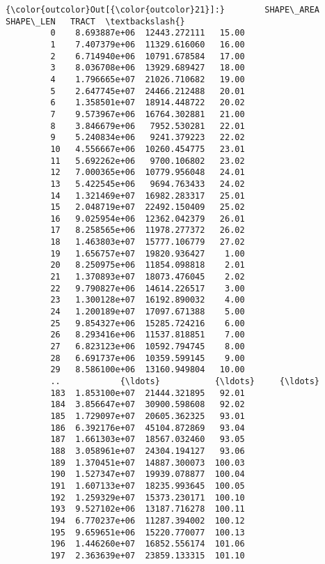 \documentclass[11pt]{article}
\begin{document}
\begin{Verbatim}[commandchars=\\\{\}]
{\color{outcolor}Out[{\color{outcolor}21}]:}        SHAPE\_AREA     SHAPE\_LEN   TRACT  \textbackslash{}
         0    8.693887e+06  12443.272111   15.00   
         1    7.407379e+06  11329.616060   16.00   
         2    6.714940e+06  10791.678584   17.00   
         3    8.036708e+06  13929.689427   18.00   
         4    1.796665e+07  21026.710682   19.00   
         5    2.647745e+07  24466.212488   20.01   
         6    1.358501e+07  18914.448722   20.02   
         7    9.573967e+06  16764.302881   21.00   
         8    3.846679e+06   7952.530281   22.01   
         9    5.240834e+06   9241.379223   22.02   
         10   4.556667e+06  10260.454775   23.01   
         11   5.692262e+06   9700.106802   23.02   
         12   7.000365e+06  10779.956048   24.01   
         13   5.422545e+06   9694.763433   24.02   
         14   1.321469e+07  16982.283317   25.01   
         15   2.048719e+07  22492.150409   25.02   
         16   9.025954e+06  12362.042379   26.01   
         17   8.258565e+06  11978.277372   26.02   
         18   1.463803e+07  15777.106779   27.02   
         19   1.656757e+07  19820.936427    1.00   
         20   8.250975e+06  11854.098818    2.01   
         21   1.370893e+07  18073.476045    2.02   
         22   9.790827e+06  14614.226517    3.00   
         23   1.300128e+07  16192.890032    4.00   
         24   1.200189e+07  17097.671388    5.00   
         25   9.854327e+06  15285.724216    6.00   
         26   8.293416e+06  11537.818851    7.00   
         27   6.823123e+06  10592.794745    8.00   
         28   6.691737e+06  10359.599145    9.00   
         29   8.586100e+06  13160.949804   10.00   
         ..            {\ldots}           {\ldots}     {\ldots}   
         183  1.853100e+07  21444.321895   92.01   
         184  3.856647e+07  30900.598608   92.02   
         185  1.729097e+07  20605.362325   93.01   
         186  6.392176e+07  45104.872869   93.04   
         187  1.661303e+07  18567.032460   93.05   
         188  3.058961e+07  24304.194127   93.06   
         189  1.370451e+07  14887.300073  100.03   
         190  1.527347e+07  19939.078877  100.04   
         191  1.607133e+07  18235.993645  100.05   
         192  1.259329e+07  15373.230171  100.10   
         193  9.527102e+06  13187.716278  100.11   
         194  6.770237e+06  11287.394002  100.12   
         195  9.659651e+06  15220.770077  100.13   
         196  1.446260e+07  16852.556174  101.06   
         197  2.363639e+07  23859.133315  101.10   

\end{Verbatim}
\end{document}
